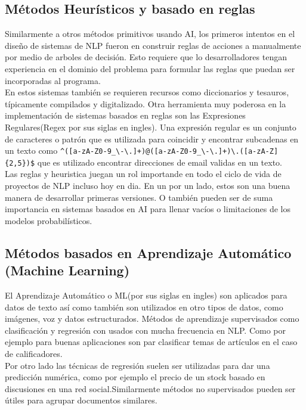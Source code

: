 \subsection{Métodos Heurísticos y basado en reglas}

Similarmente a otros métodos primitivos usando AI, los primeros intentos en el diseño de sistemas
de NLP fueron
en construir reglas de acciones a manualmente por medio de arboles de decisión. Esto requiere que
lo desarrolladores tengan
experiencia en el dominio
del problema para formular las reglas que puedan ser incorporadas al programa.\\
En estos sistemas también se requieren recursos como diccionarios y tesauros, típicamente
compilados y digitalizado. Otra
herramienta muy poderosa en la implementación de sistemas basados en reglas son las Expresiones
Regulares(Regex por sus
siglas en ingles). Una expresión regular es un conjunto de caracteres o patrón que es utilizada
para coincidir y
encontrar subcadenas en un texto como
\verb|^([a-zA-Z0-9_\-\.]+)@([a-zA-Z0-9_\-\.]+)\.([a-zA-Z]{2,5})$|
que es utilizado encontrar direcciones de email validas en un texto.\\
Las reglas y heuristica juegan un rol importande en todo el ciclo de vida de proyectos de NLP
incluso hoy en dia. En un
por un lado, estos son una buena manera de desarrollar primeras versiones. O también pueden ser de
suma importancia en
sistemas basados en AI para llenar vacíos o limitaciones de los modelos probabilísticos.
\cite{sowmya_practical_npl}

\subsection{Métodos basados en Aprendizaje Automático (Machine Learning)}
El Aprendizaje Automático o ML(por sus siglas en ingles) son aplicados para datos de texto así como
también son utilizados
en otro tipos de datos, como imágenes, voz y datos estructurados. Métodos de aprendizaje
supervisados como clasificación y
regresión con usados con mucha frecuencia en NLP. Como por ejemplo para buenas aplicaciones son par
clasificar temas de
artículos en el caso de calificadores.\\
Por otro lado las técnicas de regresión suelen ser utilizadas para dar una predicción numérica,
como por ejemplo el precio
de un stock basado en discusiones en una red social.Similarmente métodos no supervisados pueden ser
útiles para
agrupar documentos similares.
